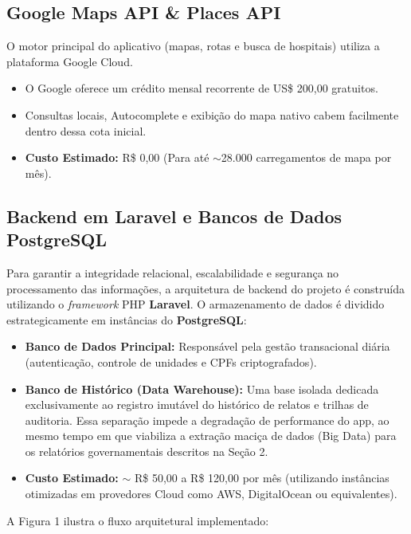 \documentclass[12pt, a4paper]{article}
\begin{document}
\subsection{Google Maps API \& Places API}
O motor principal do aplicativo (mapas, rotas e busca de hospitais) utiliza a plataforma Google Cloud.
\begin{itemize}
    \item O Google oferece um crédito mensal recorrente de US\$ 200,00 gratuitos.
    \item Consultas locais, Autocomplete e exibição do mapa nativo cabem facilmente dentro dessa cota inicial.
    \item \textbf{Custo Estimado:} R\$ 0,00 (Para até $\sim$28.000 carregamentos de mapa por mês).
\end{itemize}

\subsection{Backend em Laravel e Bancos de Dados PostgreSQL}
Para garantir a integridade relacional, escalabilidade e segurança no processamento das informações, a arquitetura de backend do projeto é construída utilizando o \textit{framework} PHP \textbf{Laravel}. O armazenamento de dados é dividido estrategicamente em instâncias do \textbf{PostgreSQL}:
\begin{itemize}
    \item \textbf{Banco de Dados Principal:} Responsável pela gestão transacional diária (autenticação, controle de unidades e CPFs criptografados).
    \item \textbf{Banco de Histórico (Data Warehouse):} Uma base isolada dedicada exclusivamente ao registro imutável do histórico de relatos e trilhas de auditoria. Essa separação impede a degradação de performance do app, ao mesmo tempo em que viabiliza a extração maciça de dados (Big Data) para os relatórios governamentais descritos na Seção 2.
    \item \textbf{Custo Estimado:} $\sim$ R\$ 50,00 a R\$ 120,00 por mês (utilizando instâncias otimizadas em provedores Cloud como AWS, DigitalOcean ou equivalentes).
\end{itemize}

A Figura 1 ilustra o fluxo arquitetural implementado:
\end{document}
